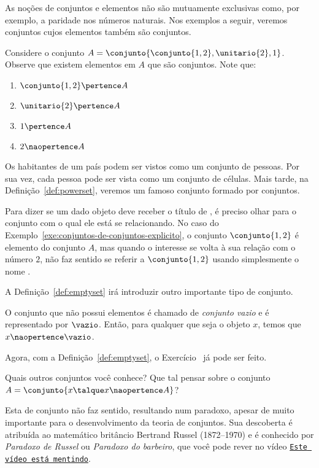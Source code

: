 As noções de conjuntos e elementos não são mutuamente exclusivas como, por exemplo, a paridade nos números naturais. Nos exemplos a seguir, veremos conjuntos cujos elementos também são conjuntos.

\begin{example}
    \label{exe:conjuntos-de-conjuntos-explicito}
    Considere o conjunto $A = \conjunto{\conjunto{1, 2},\unitario{2}, 1}$. Observe que existem elementos em $A$ que são conjuntos. Note que:
    \begin{enumerate}
        \item $\conjunto{1, 2} \pertence A$
        \item $\unitario{2} \pertence A$
        \item $1 \pertence A$
        \item $2 \naopertence A$
    \end{enumerate}
\end{example}

\begin{example}
    \label{exe:conjuntos-de-conjuntos-implicito}
    Os habitantes de um país podem ser vistos como um conjunto de pessoas. Por sua vez, cada pessoa pode ser vista como um conjunto de células. Mais tarde, na Definição~\ref{def:powerset}, veremos um famoso conjunto formado por conjuntos.
\end{example}

Para dizer se um dado objeto deve receber o título de , é preciso olhar para o conjunto com o qual ele está se relacionando. No caso do Exemplo~\ref{exe:conjuntos-de-conjuntos-explicito}, o conjunto $\conjunto{1, 2}$ é elemento do conjunto $A$, mas quando o interesse se volta à sua relação com o número $2$, não faz sentido se referir a $\conjunto{1, 2}$ usando simplesmente o nome .

A Definição~\ref{def:emptyset} irá introduzir outro importante tipo de conjunto.

\begin{definition}
    \label{def:emptyset} %
    O conjunto que não possui elementos é chamado de \emph{conjunto vazio} e é representado por $\vazio$. Então, para qualquer que seja o objeto $x$, temos que $x \naopertence \vazio$.
\end{definition}

Agora, com a Definição~\ref{def:emptyset}, o Exercício~ já pode ser feito.

\begin{example}
    Quais outros conjuntos você conhece? Que tal pensar sobre o conjunto $A = \conjunto{ x \talque x \naopertence A}$?
\end{example}

Esta  de conjunto não faz sentido, resultando num paradoxo, apesar de muito importante para o desenvolvimento da teoria de conjuntos. Sua descoberta é atribuída ao matemático britâncio Bertrand Russel (1872--1970) e é conhecido por \emph{Paradoxo de Russel} ou \emph{Paradoxo do barbeiro}, que você pode rever no vídeo \href{https://youtu.be/UI1xR_AECrU}{\texttt{Este vídeo está mentindo}}.